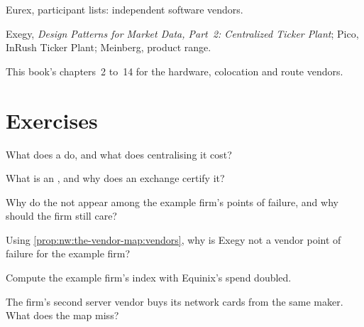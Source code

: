 \begin{omsources}
\item Eurex, participant lists: independent software vendors.
\item Exegy, \emph{Design Patterns for Market Data, Part~2: Centralized Ticker Plant}; Pico, InRush Ticker Plant; Meinberg,
  product range.
\item This book's chapters~2 to~14 for the hardware, colocation and route vendors.
\end{omsources}

\section{Exercises}

\begin{exercise}[$\star$]\label{exo:nw:the-vendor-map:1}
What does a  do, and what does centralising it cost?
\end{exercise}

\begin{exercise}[$\star$]\label{exo:nw:the-vendor-map:2}
What is an , and why does an exchange certify it?
\end{exercise}

\begin{exercise}[$\star$]\label{exo:nw:the-vendor-map:3}
Why do the  not appear among the example firm's points of failure, and why should the firm still care?
\end{exercise}

\begin{exercise}[$\star\star$]\label{exo:nw:the-vendor-map:4}
Using \cref{prop:nw:the-vendor-map:vendors}, why is Exegy not a vendor point of failure for the example firm?
\end{exercise}

\begin{exercise}[$\star\star$]\label{exo:nw:the-vendor-map:5}
Compute the example firm's index with Equinix's spend doubled.
\end{exercise}

\begin{exercise}[$\star\star$]\label{exo:nw:the-vendor-map:6}
The firm's second server vendor buys its network cards from the same maker. What does the map miss?
\end{exercise}

